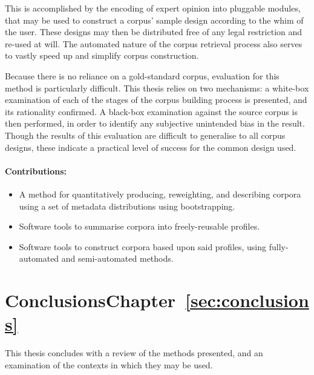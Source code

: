 This is accomplished by the encoding of expert opinion into pluggable modules, that may be used to construct a corpus' sample design according to the whim of the user.  These designs may then be distributed free of any legal restriction and re-used at will.  The automated nature of the corpus retrieval process also serves to vastly speed up and simplify corpus construction.

Because there is no reliance on a gold-standard corpus, evaluation for this method is particularly difficult.  This thesis relies on two mechanisms: a white-box examination of each of the stages of the corpus building process is presented, and its rationality confirmed.  A black-box examination against the source corpus is then performed, in order to identify any subjective unintended bias in the result.  Though the results of this evaluation are difficult to generalise to all corpus designs, these indicate a practical level of success for the common design used.

\paragraph{Contributions:}
\begin{itemize}
    \item A method for quantitatively producing, reweighting, and describing corpora using a set of metadata distributions using bootstrapping.
    \item Software tools to summarise corpora into freely-reusable profiles.
    \item Software tools to construct corpora based upon said profiles, using fully-automated and semi-automated methods.
\end{itemize}


\section*{Conclusions\hfill{}Chapter~\ref{sec:conclusions}}
This thesis concludes with a review of the methods presented, and an examination of the contexts in which they may be used.

\sepline


